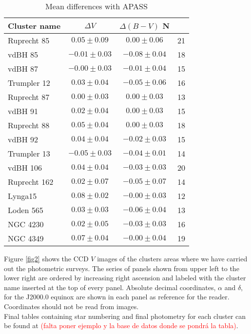 \documentclass{aa}
\begin{document}
\begin{table}[ht]
    \centering
    \begin{tabular}{lccc}
    \hline
    Cluster name & $\Delta V$ & $\Delta (B-V)$ N  \\
    \hline \hline
    Ruprecht 85 & $0.05\pm0.09$ & $0.00\pm0.06$ & 21\\
    vdBH 85 & $-0.01\pm0.03$ & $-0.08\pm0.04$ & 18\\
    vdBH 87 & $-0.00\pm0.03$ & $-0.01\pm0.04$ & 15\\
    Trumpler 12 & $0.03\pm0.04$ & $-0.05\pm0.06$ & 16\\
    Ruprecht 87 & $0.00\pm0.03$ & $0.00\pm0.03$ & 13\\
    vdBH 91 & $0.02\pm0.04$ & $0.00\pm0.03$ & 15\\
    Ruprecht 88 & $0.05\pm0.04$ & $0.00\pm0.03$ & 18\\
    vdBH 92 & $0.04\pm0.04$ & $-0.02\pm0.03$ & 15\\
    Trumpler 13 & $-0.05\pm0.03$ & $-0.04\pm0.01$ & 14\\
    vdBH 106 & $0.04\pm0.04$ & $-0.03\pm0.03$ & 20\\
    Ruprecht 162 & $0.02\pm0.07$ & $-0.05\pm0.07$ & 14\\
    Lynga15 & $0.08\pm0.02$ & $-0.00\pm0.03$ & 12\\
    Loden 565 & $0.03\pm0.03$ & $-0.06\pm0.04$ & 13\\
    NGC 4230 & $0.02\pm0.05$ & $-0.03\pm0.03$ & 16\\
    NGC 4349 & $0.07\pm0.04$ & $-0.00\pm0.04$ & 19\\
    \hline
    \end{tabular}
    \caption{Mean differences with APASS}
    \label{tab:apass_diffs}
\end{table}

Figure \ref{fig2} shows the CCD $V$ images of the clusters areas where we have
carried out the photometric surveys. The series of panels shown from upper left
to the lower right are ordered by increasing right ascension and labeled with
the cluster name inserted at the top of every panel. Absolute decimal
coordinates, $\alpha$ and $\delta$, for the J2000.0 equinox are shown in each
panel as reference for the reader. Coordinates should not be read from images.\\

Final tables containing star numbering and final photometry for each cluster can
be found at \textcolor{red}{(falta poner ejemplo y la base de datos donde se
pondrá la tabla)}.
\end{document}
